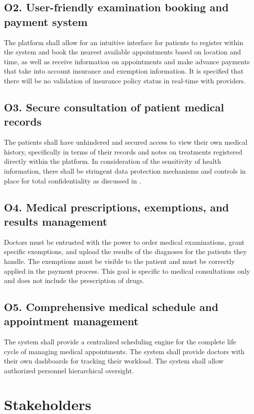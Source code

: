 \documentclass[12pt, a4paper]{article}
\begin{document}
\subsection{O2. User-friendly examination booking and payment system} \label{O2}
The platform shall allow for an intuitive interface for patients to register within the system and book the nearest available appointments based on location and time, as well as receive information on appointments and make advance payments that take into account insurance and exemption information. It is specified that there will be no validation of insurance policy status in real-time with providers.

\subsection{O3. Secure consultation of patient medical records} \label{O3}
The patients shall have unhindered and secured access to view their own medical history, specifically in terms of their records and notes on treatments registered directly within the platform. In consideration of the sensitivity of health information, there shall be stringent data protection mechanisms and controls in place for total confidentiality as discussed in .

\subsection{O4. Medical prescriptions, exemptions, and results management} \label{O4}
Doctors must be entrusted with the power to order medical examinations, grant specific exemptions, and upload the results of the diagnoses for the patients they handle. The exemptions must be visible to the patient and must be correctly applied in the payment process. This goal is specific to medical consultations only and does not include the prescription of drugs.

\subsection{O5. Comprehensive medical schedule and appointment management} \label{O5}
The system shall provide a centralized scheduling engine for the complete life cycle of managing medical appointments. The system shall provide doctors with their own dashboards for tracking their workload. The system shall allow authorized personnel hierarchical oversight. 
\newpage


\section{Stakeholders}
\end{document}
